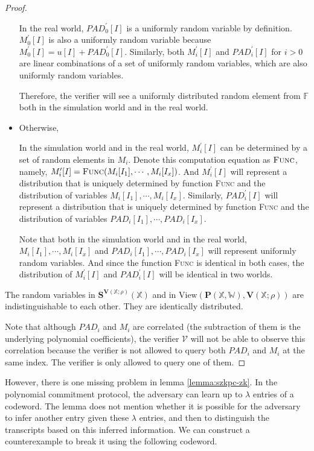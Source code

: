 \begin{proof}
\begin{itemize}
    In the real world, $PAD_0^\prime[I]$ is a uniformly random variable by definition. $M_0^\prime[I]$ is also a uniformly random variable because $M_0^\prime[I] = u[I] + PAD_0^\prime[I]$. Similarly, both $M_i^\prime[I]$ and $PAD_i^\prime[I]$ for $i > 0$ are linear combinations of a set of uniformly random variables, which are also uniformly random variables.
    
    Therefore, the verifier will see a uniformly distributed random element from $\mathbb{F}$ both in the simulation world and in the real world.
    
    \item Otherwise,
    
    In the simulation world and in the real world, $M_i^\prime[I]$ can be determined by a set of random elements in $M_i$. Denote this computation equation as $\textsc{Func}$, namely, $M_i^\prime[I] = \textsc{Func}(M_i[I_1], \cdots, M_i[I_x])$. And $M_i^\prime[I]$ will represent a distribution that is uniquely determined by function \textsc{Func} and the distribution of variables $M_i[I_1], \cdots, M_i[I_x]$. Similarly, $PAD_i^\prime[I]$ will represent a distribution that is uniquely determined by function \textsc{Func} and the distribution of variables $PAD_i[I_1], \cdots, PAD_i[I_x]$.
    
    Note that both in the simulation world and in the real world, $M_i[I_1], \cdots, M_i[I_x]$ and $PAD_i[I_1], \cdots, PAD_i[I_x]$ will represent uniformly random variables. And since the function \textsc{Func} is identical in both cases, the distribution of $M_i^\prime[I]$ and $PAD_i^\prime[I]$ will be identical in two worlds.
    
    
\end{itemize}

The random variables in $\textbf{S}^{\textbf{V}(\mathbb{X};\rho)}(\mathbb{X})$ and in $\text{View}(\textbf{P}(\mathbb{X}, \mathbb{W}), \textbf{V}(\mathbb{X};\rho))$ are indistinguishable to each other. They are identically distributed.

Note that although $PAD_i$ and $M_i$ are correlated (the subtraction of them is the underlying polynomial coefficients), the verifier $\mathcal{V}$ will not be able to observe this correlation because the verifier is not allowed to query both $PAD_i$ and $M_i$ at the same index. The verifier is only allowed to query one of them.

\end{proof}
However, there is one missing problem in lemma \ref{lemma:szkpc-zk}. In the polynomial commitment protocol, the adversary can learn up to $\lambda$ entries of a codeword.
The lemma does not mention whether it is possible for the adversary to infer another entry given these $\lambda$ entries, and then to distinguish the transcripts based on this inferred information. We can construct a counterexample to break it using the following codeword.

